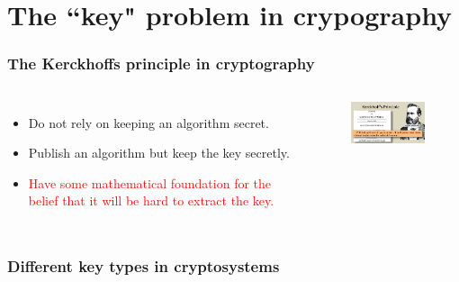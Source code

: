 \documentclass[aspectratio=169,xcolor=dvipsnames]{beamer}
\begin{document}
\section{The ``key" problem in crypography}

\frame
{
\frametitle{The Kerckhoffs principle in cryptography}
\begin{columns}[c]
\begin{itemize}
\setlength{\itemsep}{12pt}
\item Do not rely on keeping an algorithm secret.
\item Publish an algorithm but keep the key secretly.
\item \textcolor{red}{Have some mathematical foundation for the belief that it will be hard to extract the key.}
\end{itemize}

\begin{figure}[htbp]
\centering
  \includegraphics[width=4cm]{./pics/Kerckhoff.jpg}
\end{figure}

\end{columns}
}

\frame
{
\frametitle{Different key types in cryptosystems}
\begin{center}
\end{center}
}
\end{document}
